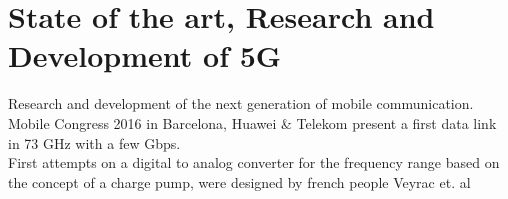\chapter{State of the art, Research and Development of 5G}
Research and development of the next generation of mobile communication. Mobile Congress 2016 in Barcelona, Huawei \& Telekom present a first data link in 73 GHz with a few Gbps.\\
First attempts on a digital to analog converter for the frequency range based on the concept of a charge pump, were designed by french people Veyrac et. al